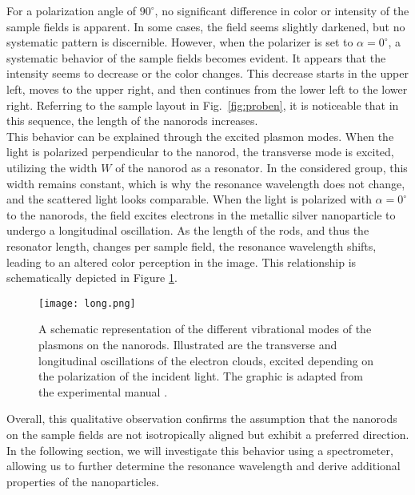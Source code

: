 For a polarization angle of $90^{\circ}$, no significant difference in color or intensity of the 
sample fields is apparent. 
In some cases, the field seems slightly darkened, but no systematic pattern is discernible. 
However, when the polarizer is set to $\alpha=0^{\circ}$, a systematic behavior of the sample 
fields becomes evident. 
It appears that the intensity seems to decrease or the color changes. 
This decrease starts in the upper left, moves to the upper right, 
and then continues from the lower left to the lower right. 
Referring to the sample layout in Fig.~\ref{fig:proben}, it is noticeable that in this sequence, 
the length of the nanorods increases. \\
This behavior can be explained through the excited plasmon modes. 
When the light is polarized perpendicular to the nanorod, the transverse mode is excited, 
utilizing the width $W$ of the nanorod as a resonator. 
In the considered group, this width remains constant, which is why the resonance 
wavelength does not change, and the scattered light looks comparable. 
When the light is polarized with $\alpha=0^{\circ}$ to the nanorods, 
the field excites electrons in the metallic silver nanoparticle to undergo 
a longitudinal oscillation. 
As the length of the rods, and thus the resonator length, changes per sample field, 
the resonance wavelength shifts, leading to an altered color perception in the image. 
This relationship is schematically depicted in Figure \ref{fig:long}.
\begin{figure}[h!]
    \centering
    \texttt{[image: long.png]}
    \caption{\label{fig:long}A schematic representation of the different vibrational modes of the 
    plasmons on the nanorods. Illustrated are the transverse and longitudinal oscillations of 
    the electron clouds, excited depending on the polarization of the incident light. 
    The graphic is adapted from the experimental manual \cite{Anleitung}.}
\end{figure} \FloatBarrier
Overall, this qualitative observation confirms the assumption that the nanorods on the sample 
fields are not isotropically aligned but exhibit a preferred direction. In the following section, 
we will investigate this behavior using a spectrometer, allowing us to further determine the 
resonance wavelength and derive additional properties of the nanoparticles. \newpage



  